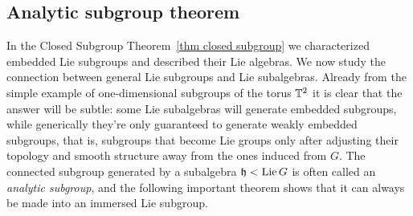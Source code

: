 \subsection{Analytic subgroup theorem}\label{sec: analytic subgroup theorem}

In the Closed Subgroup Theorem~\ref{thm closed subgroup} we characterized embedded Lie subgroups and described their Lie algebras. We now study the connection between general Lie subgroups and Lie subalgebras. Already from the simple example of one-dimensional subgroups of the torus $\mathbb{T}^2$ it is clear that the answer will be subtle: some Lie subalgebras will generate embedded subgroups, while generically they're only guaranteed to generate weakly embedded subgroups, that is, subgroups that become Lie groups only after adjusting their topology and smooth structure away from the ones induced from $G$. The connected subgroup generated by a subalgebra $\mathfrak{h}< \operatorname{Lie} G$ is often called an \emph{analytic subgroup}, and the following important theorem shows that it can always be made into an immersed Lie subgroup.


